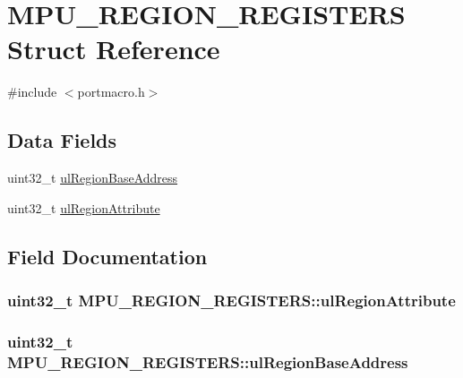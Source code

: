 \hypertarget{structMPU__REGION__REGISTERS}{\section{M\-P\-U\-\_\-\-R\-E\-G\-I\-O\-N\-\_\-\-R\-E\-G\-I\-S\-T\-E\-R\-S Struct Reference}
\label{structMPU__REGION__REGISTERS}
}


{\ttfamily \#include $<$portmacro.\-h$>$}

\subsection*{Data Fields}
\begin{DoxyCompactItemize}
\item 
uint32\-\_\-t \hyperlink{structMPU__REGION__REGISTERS_a31d889401a490033e2224d9a90934eb1}{ul\-Region\-Base\-Address}
\item 
uint32\-\_\-t \hyperlink{structMPU__REGION__REGISTERS_a6f33d6011da06410a3c05fb0a3aa9a6d}{ul\-Region\-Attribute}
\end{DoxyCompactItemize}


\subsection{Field Documentation}
\hypertarget{structMPU__REGION__REGISTERS_a6f33d6011da06410a3c05fb0a3aa9a6d}{
\subsubsection[{ul\-Region\-Attribute}]{\setlength{\rightskip}{0pt plus 5cm}uint32\-\_\-t M\-P\-U\-\_\-\-R\-E\-G\-I\-O\-N\-\_\-\-R\-E\-G\-I\-S\-T\-E\-R\-S\-::ul\-Region\-Attribute}}\label{structMPU__REGION__REGISTERS_a6f33d6011da06410a3c05fb0a3aa9a6d}
\hypertarget{structMPU__REGION__REGISTERS_a31d889401a490033e2224d9a90934eb1}{
\subsubsection[{ul\-Region\-Base\-Address}]{\setlength{\rightskip}{0pt plus 5cm}uint32\-\_\-t M\-P\-U\-\_\-\-R\-E\-G\-I\-O\-N\-\_\-\-R\-E\-G\-I\-S\-T\-E\-R\-S\-::ul\-Region\-Base\-Address}}\label{structMPU__REGION__REGISTERS_a31d889401a490033e2224d9a90934eb1}


